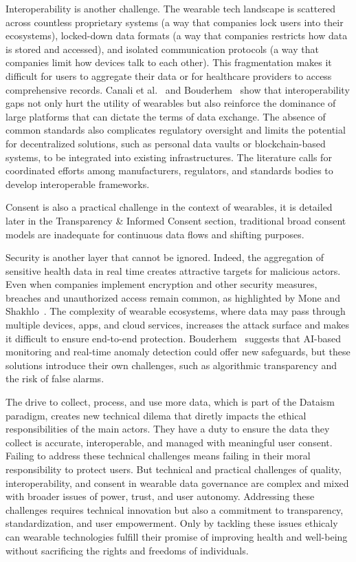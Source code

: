 	Interoperability is another challenge. The wearable tech landscape is scattered across countless proprietary systems (a way that companies lock users into their ecosystems), locked-down data formats (a way that companies restricts how data is stored and accessed), and isolated communication protocols (a way that companies limit how devices talk to each other). This fragmentation makes it difficult for users to aggregate their data or for healthcare providers to access comprehensive records. Canali et al.~\cite{Canali2022} and Bouderhem~\cite{Bouderhem2023} show that interoperability gaps not only hurt the utility of wearables but also reinforce the dominance of large platforms that can dictate the terms of data exchange. The absence of common standards also complicates regulatory oversight and limits the potential for decentralized solutions, such as personal data vaults or blockchain-based systems, to be integrated into existing infrastructures. The literature calls for coordinated efforts among manufacturers, regulators, and standards bodies to develop interoperable frameworks.

	Consent is also a practical challenge in the context of wearables, it is detailed later in the Transparency \& Informed Consent section, traditional broad consent models are inadequate for continuous data flows and shifting purposes.

	Security is another layer that cannot be ignored. Indeed, the aggregation of sensitive health data in real time creates attractive targets for malicious actors. Even when companies implement encryption and other security measures, breaches and unauthorized access remain common, as highlighted by Mone and Shakhlo~\cite{Mone2023}. The complexity of wearable ecosystems, where data may pass through multiple devices, apps, and cloud services, increases the attack surface and makes it difficult to ensure end-to-end protection. Bouderhem~\cite{Bouderhem2023} suggests that AI-based monitoring and real-time anomaly detection could offer new safeguards, but these solutions introduce their own challenges, such as algorithmic transparency and the risk of false alarms.

	The drive to collect, process, and use more data, which is part of the Dataism paradigm, creates new technical dilema that diretly impacts the ethical responsibilities of the main actors. They have a duty to ensure the data they collect is accurate, interoperable, and managed with meaningful user consent. Failing to address these technical challenges means failing in their moral responsibility to protect users. But technical and practical challenges of quality, interoperability, and consent in wearable data governance are complex and mixed with broader issues of power, trust, and user autonomy. Addressing these challenges requires technical innovation but also a commitment to transparency, standardization, and user empowerment. Only by tackling these issues ethicaly can wearable technologies fulfill their promise of improving health and well-being without sacrificing the rights and freedoms of individuals.
